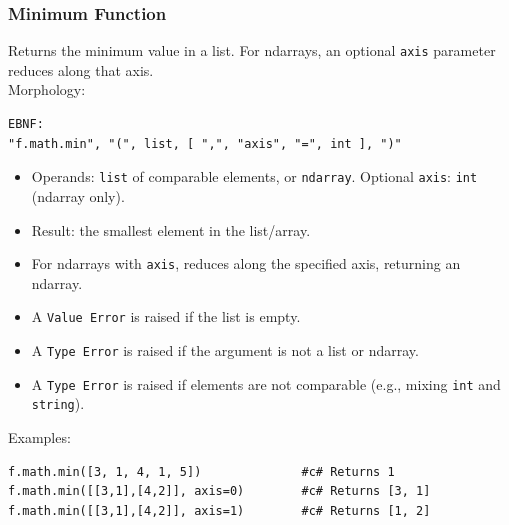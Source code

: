 \subsubsection{Minimum Function}
Returns the minimum value in a list. For ndarrays, an optional \texttt{axis} parameter reduces along that axis. \\
Morphology:
\begin{verbatim}
EBNF:
"f.math.min", "(", list, [ ",", "axis", "=", int ], ")"
\end{verbatim}
\begin{itemize}
\item Operands: \texttt{list} of comparable elements, or \texttt{ndarray}. Optional \texttt{axis}: \texttt{int} (ndarray only).
\item Result: the smallest element in the list/array.
\item For ndarrays with \texttt{axis}, reduces along the specified axis, returning an ndarray.
\item A \texttt{Value Error} is raised if the list is empty.
\item A \texttt{Type Error} is raised if the argument is not a list or ndarray.
\item A \texttt{Type Error} is raised if elements are not comparable (e.g., mixing \texttt{int} and \texttt{string}).
\end{itemize}
Examples:
\begin{verbatim}
f.math.min([3, 1, 4, 1, 5])              #c# Returns 1
f.math.min([[3,1],[4,2]], axis=0)        #c# Returns [3, 1]
f.math.min([[3,1],[4,2]], axis=1)        #c# Returns [1, 2]
\end{verbatim}

